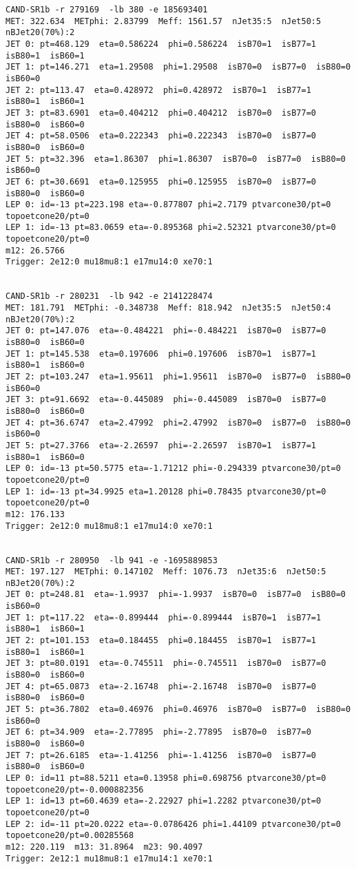 \begin{footnotesize}
\begin{verbatim}
CAND-SR1b -r 279169  -lb 380 -e 185693401 
MET: 322.634  METphi: 2.83799  Meff: 1561.57  nJet35:5  nJet50:5  nBJet20(70%):2 
JET 0: pt=468.129  eta=0.586224  phi=0.586224  isB70=1  isB77=1  isB80=1  isB60=1
JET 1: pt=146.271  eta=1.29508  phi=1.29508  isB70=0  isB77=0  isB80=0  isB60=0
JET 2: pt=113.47  eta=0.428972  phi=0.428972  isB70=1  isB77=1  isB80=1  isB60=1
JET 3: pt=83.6901  eta=0.404212  phi=0.404212  isB70=0  isB77=0  isB80=0  isB60=0
JET 4: pt=58.0506  eta=0.222343  phi=0.222343  isB70=0  isB77=0  isB80=0  isB60=0
JET 5: pt=32.396  eta=1.86307  phi=1.86307  isB70=0  isB77=0  isB80=0  isB60=0
JET 6: pt=30.6691  eta=0.125955  phi=0.125955  isB70=0  isB77=0  isB80=0  isB60=0
LEP 0: id=-13 pt=223.198 eta=-0.877807 phi=2.7179 ptvarcone30/pt=0 topoetcone20/pt=0
LEP 1: id=-13 pt=83.0659 eta=-0.895368 phi=2.52321 ptvarcone30/pt=0 topoetcone20/pt=0
m12: 26.5766
Trigger: 2e12:0 mu18mu8:1 e17mu14:0 xe70:1


CAND-SR1b -r 280231  -lb 942 -e 2141228474 
MET: 181.791  METphi: -0.348738  Meff: 818.942  nJet35:5  nJet50:4  nBJet20(70%):2  
JET 0: pt=147.076  eta=-0.484221  phi=-0.484221  isB70=0  isB77=0  isB80=0  isB60=0
JET 1: pt=145.538  eta=0.197606  phi=0.197606  isB70=1  isB77=1  isB80=1  isB60=0
JET 2: pt=103.247  eta=1.95611  phi=1.95611  isB70=0  isB77=0  isB80=0  isB60=0
JET 3: pt=91.6692  eta=-0.445089  phi=-0.445089  isB70=0  isB77=0  isB80=0  isB60=0
JET 4: pt=36.6747  eta=2.47992  phi=2.47992  isB70=0  isB77=0  isB80=0  isB60=0
JET 5: pt=27.3766  eta=-2.26597  phi=-2.26597  isB70=1  isB77=1  isB80=1  isB60=0
LEP 0: id=-13 pt=50.5775 eta=-1.71212 phi=-0.294339 ptvarcone30/pt=0 topoetcone20/pt=0
LEP 1: id=-13 pt=34.9925 eta=1.20128 phi=0.78435 ptvarcone30/pt=0 topoetcone20/pt=0
m12: 176.133
Trigger: 2e12:0 mu18mu8:1 e17mu14:0 xe70:1


CAND-SR1b -r 280950  -lb 941 -e -1695889853 
MET: 197.127  METphi: 0.147102  Meff: 1076.73  nJet35:6  nJet50:5  nBJet20(70%):2  
JET 0: pt=248.81  eta=-1.9937  phi=-1.9937  isB70=0  isB77=0  isB80=0  isB60=0
JET 1: pt=117.22  eta=-0.899444  phi=-0.899444  isB70=1  isB77=1  isB80=1  isB60=1
JET 2: pt=101.153  eta=0.184455  phi=0.184455  isB70=1  isB77=1  isB80=1  isB60=1
JET 3: pt=80.0191  eta=-0.745511  phi=-0.745511  isB70=0  isB77=0  isB80=0  isB60=0
JET 4: pt=65.0873  eta=-2.16748  phi=-2.16748  isB70=0  isB77=0  isB80=0  isB60=0
JET 5: pt=36.7802  eta=0.46976  phi=0.46976  isB70=0  isB77=0  isB80=0  isB60=0
JET 6: pt=34.909  eta=-2.77895  phi=-2.77895  isB70=0  isB77=0  isB80=0  isB60=0
JET 7: pt=26.6185  eta=-1.41256  phi=-1.41256  isB70=0  isB77=0  isB80=0  isB60=0
LEP 0: id=11 pt=88.5211 eta=0.13958 phi=0.698756 ptvarcone30/pt=0 topoetcone20/pt=-0.000882356
LEP 1: id=13 pt=60.4639 eta=-2.22927 phi=1.2282 ptvarcone30/pt=0 topoetcone20/pt=0
LEP 2: id=-11 pt=20.0222 eta=-0.0786426 phi=1.44109 ptvarcone30/pt=0 topoetcone20/pt=0.00285568
m12: 220.119  m13: 31.8964  m23: 90.4097
Trigger: 2e12:1 mu18mu8:1 e17mu14:1 xe70:1


\end{verbatim}
\end{footnotesize}
